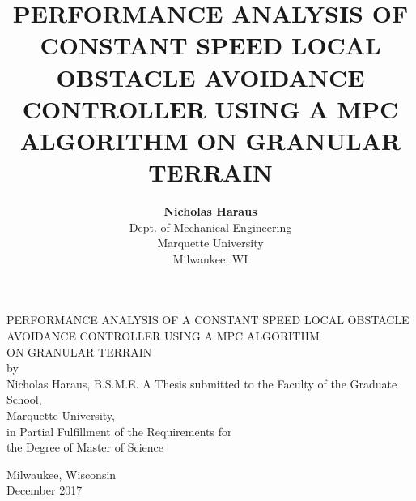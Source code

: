\documentclass[12pt,onecolumn]{report}
\title{\myfont PERFORMANCE ANALYSIS OF CONSTANT SPEED LOCAL OBSTACLE AVOIDANCE CONTROLLER USING A MPC ALGORITHM ON GRANULAR TERRAIN}
\author{
	{\bf Nicholas Haraus}\\
	Dept. of Mechanical Engineering\\
	Marquette University\\
	Milwaukee, WI
}
\renewcommand{\headrulewidth}{0pt}
\begin{document}
\fancyhf{} %
\renewcommand{\headrulewidth}{0pt}

\onecolumn
\begin{singlespacing}
\begin{center}
PERFORMANCE ANALYSIS OF A CONSTANT SPEED LOCAL OBSTACLE\\ AVOIDANCE CONTROLLER USING A MPC ALGORITHM\\ ON GRANULAR TERRAIN
\\
\vfill
by\\
\vspace{0.1in}
Nicholas Haraus, B.S.M.E.
\vfill
A Thesis submitted to the Faculty of the Graduate School,\\
Marquette University,\\
in Partial Fulfillment of the Requirements for\\
the Degree of Master of Science

\vfill
Milwaukee, Wisconsin\\
\vspace{0.1in}
December 2017
\end{center}
\end{singlespacing}
\newpage
\end{document}
